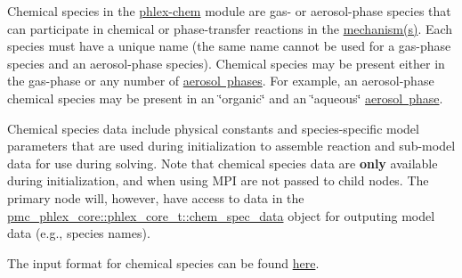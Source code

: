 Chemical species in the \mbox{\hyperlink{phlex_chem}{phlex-\/chem}} module are gas-\/ or aerosol-\/phase species that can participate in chemical or phase-\/transfer reactions in the \mbox{\hyperlink{phlex_mechanism}{mechanism(s)}}. Each species must have a unique name (the same name cannot be used for a gas-\/phase species and an aerosol-\/phase species). Chemical species may be present either in the gas-\/phase or any number of \mbox{\hyperlink{phlex_aero_phase}{aerosol phases}}. For example, an aerosol-\/phase chemical species may be present in an \char`\"{}organic\char`\"{} and an \char`\"{}aqueous\char`\"{} \mbox{\hyperlink{phlex_aero_phase}{aerosol phase}}.

Chemical species data include physical constants and species-\/specific model parameters that are used during initialization to assemble reaction and sub-\/model data for use during solving. Note that chemical species data are {\bfseries only} available during initialization, and when using M\+PI are not passed to child nodes. The primary node will, however, have access to data in the {\ttfamily \mbox{\hyperlink{structpmc__phlex__core_1_1phlex__core__t_aff3bb5cb12638af6de6ee3b8b65a1fb3}{pmc\+\_\+phlex\+\_\+core\+::phlex\+\_\+core\+\_\+t\+::chem\+\_\+spec\+\_\+data}}} object for outputing model data (e.\+g., species names).

The input format for chemical species can be found \mbox{\hyperlink{input_format_species}{here}}. 